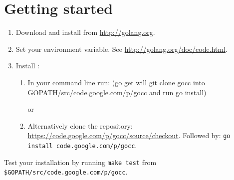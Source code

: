\documentclass[12pt]{article}
\begin{document}
\section{Getting started}
	\begin{enumerate}
		\item Download and install \Go from \url{http://golang.org}.

		\item Set your  environment variable. See \url{http://golang.org/doc/code.html}.

		\item Install \gocc:
			\begin{enumerate}
				\item In your command line run:  (go get will git clone gocc into GOPATH/src/code.google.com/p/gocc and run go install)

					or 

				\item Alternatively clone the repository: \url{https://code.google.com/p/gocc/source/checkout}. Followed by:
				\verb|go install code.google.com/p/gocc|.
			\end{enumerate}

	\end{enumerate}

	Test your installation by running \verb|make test| from \verb|$GOPATH/src/code.google.com/p/gocc|.
\end{document}
